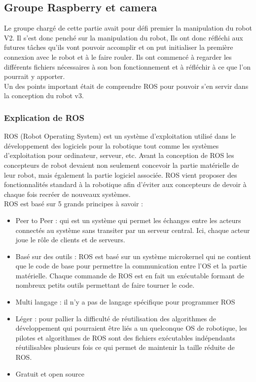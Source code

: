 \subsection{Groupe Raspberry et camera}

Le groupe chargé de cette partie avait pour défi premier la manipulation du robot V2. Il s'est donc penché sur la manipulation du robot, Ils ont donc réfléchi aux futures tâches qu'ils vont pouvoir accomplir et on put initialiser la première connexion avec le robot et à le faire rouler.
Ils ont commencé à regarder les différents fichiers nécessaires à son bon fonctionnement et à réfléchir à ce que l'on pourrait y apporter.\\

Un des points important était de comprendre ROS pour pouvoir s'en servir dans la conception du robot v3.

\subsubsection{Explication de ROS}

ROS (Robot Operating System) est un système d’exploitation utilisé dans le développement des logiciels pour la robotique tout comme les systèmes d’exploitation pour ordinateur, serveur, etc.
Avant la conception de ROS les concepteurs de robot devaient non seulement concevoir la partie matérielle de leur robot, mais également la partie logiciel associée. ROS vient proposer des fonctionnalités standard à la robotique afin d’éviter aux concepteurs de devoir à chaque fois recréer de nouveaux systèmes.\\

ROS est basé sur 5 grands principes à savoir :
\begin{itemize}
\item 	Peer to Peer : qui est un système qui permet les échanges entre les acteurs connectés au système sans transiter par un serveur central. Ici, chaque acteur joue le rôle de clients et de serveurs.
\item 	Basé sur des outils : ROS est basé sur un système microkernel qui ne contient que le code de base pour permettre la communication entre l’OS et la partie matérielle. Chaque commande de ROS est en fait un exécutable formant de nombreux petits outils permettant de faire tourner le code.
\item 	Multi langage : il n’y a pas de langage spécifique pour programmer ROS
\item 	Léger : pour pallier la difficulté de réutilisation des algorithmes de développement qui pourraient être liés a un quelconque OS de robotique, les pilotes et algorithmes de ROS sont des fichiers exécutables indépendants réutilisables plusieurs fois ce qui permet de maintenir la taille réduite de ROS.
\item 	Gratuit et open source
\end{itemize}

